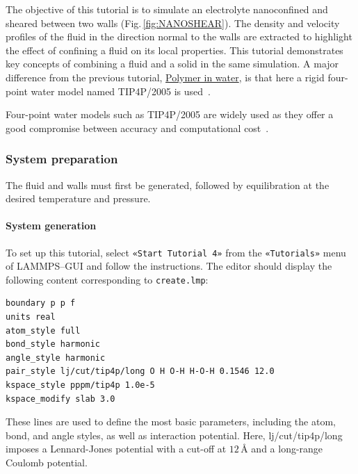 \documentclass[9pt,tutorial]{livecoms}
\newcommand{\lmpcmd}[1]{\hspace{0pt}\colorbox{listing}{\textcolor{command}{\small{#1}}}\hspace{0pt}} %
\newcommand{\flecmd}[1]{\textcolor{command}{\texttt{#1}}} %
\newcommand{\guicmd}[1]{\textcolor{command}{\texttt{«#1»}}} %
\begin{document}
\noindent The objective of this tutorial is to simulate an electrolyte
nanoconfined and sheared between two walls (Fig.\,\ref{fig:NANOSHEAR}).  The density
and velocity profiles of the fluid in the direction normal to the walls are
extracted to highlight the effect of confining a fluid on its local properties.
This tutorial demonstrates key concepts of combining a fluid and a solid in
the same simulation.  A major difference from the previous tutorial,
\hyperref[all-atom-label]{Polymer in water}, is that here a rigid four-point
water model named TIP4P/2005 is used~\cite{abascal2005general}.

\begin{note}
Four-point water models such as TIP4P/2005 are widely used as they offer a
good compromise between accuracy and computational cost~\cite{kadaoluwa2021systematic}.
\end{note}

\subsubsection{System preparation}

The fluid and walls must first be generated, followed by equilibration at the
desired temperature and pressure.

\paragraph{System generation}

To set up this tutorial, select \guicmd{Start Tutorial 4} from the
\guicmd{Tutorials} menu of LAMMPS--GUI and follow the instructions.
The editor should display the following content corresponding to \flecmd{create.lmp}:
\begin{lstlisting}
boundary p p f
units real
atom_style full
bond_style harmonic
angle_style harmonic
pair_style lj/cut/tip4p/long O H O-H H-O-H 0.1546 12.0
kspace_style pppm/tip4p 1.0e-5
kspace_modify slab 3.0
\end{lstlisting}
These lines are used to define the most basic parameters, including the
\lmpcmd{atom}, \lmpcmd{bond}, and \lmpcmd{angle} styles, as well as interaction
potential.  Here, \lmpcmd{lj/cut/tip4p/long} imposes a Lennard-Jones potential with
a cut-off at $12\,\text{$\text{\AA{}}$}$ and a long-range Coulomb potential.
\end{document}
